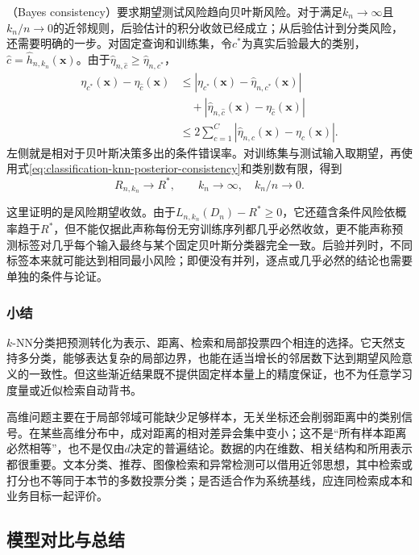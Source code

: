 （Bayes consistency）要求期望测试风险趋向贝叶斯风险。对于满足$k_n\to\infty$且$k_n/n\to0$的近邻规则，后验估计的积分收敛已经成立；从后验估计到分类风险，还需要明确的一步。对固定查询和训练集，令$c^\ast$为真实后验最大的类别，$\hat c=\hat h_{n,k_n}(\bm{x})$。由于$\hat\eta_{n,\hat c}\geq\hat\eta_{n,c^\ast}$，
\begin{align*}
  \eta_{c^\ast}(\bm{x})-\eta_{\hat c}(\bm{x})
  &\leq|\eta_{c^\ast}(\bm{x})-\hat\eta_{n,c^\ast}(\bm{x})|\\
  &\quad+|\hat\eta_{n,\hat c}(\bm{x})-\eta_{\hat c}(\bm{x})|\\
  &\leq2\sum_{c=1}^{C}
    |\hat\eta_{n,c}(\bm{x})-\eta_c(\bm{x})|.
\end{align*}
左侧就是相对于贝叶斯决策多出的条件错误率。对训练集与测试输入取期望，再使用式\eqref{eq:classification-knn-posterior-consistency}和类别数有限，得到
\begin{equation}
  R_{n,k_n}\longrightarrow R^\ast,
  \qquad k_n\to\infty,\quad k_n/n\to0.
  \label{eq:classification-knn-bayes-consistency}
\end{equation}

这里证明的是风险期望收敛。由于$L_{n,k_n}(D_n)-R^\ast\geq0$，它还蕴含条件风险依概率趋于$R^\ast$，但不能仅据此声称每份无穷训练序列都几乎必然收敛，更不能声称预测标签对几乎每个输入最终与某个固定贝叶斯分类器完全一致。后验并列时，不同标签本来就可能达到相同最小风险；即便没有并列，逐点或几乎必然的结论也需要单独的条件与论证。

\subsubsection{小结}
\label{sec:classification-knn-summary}

$k$-NN分类把预测转化为表示、距离、检索和局部投票四个相连的选择。它天然支持多分类，能够表达复杂的局部边界，也能在适当增长的邻居数下达到期望风险意义的一致性。但这些渐近结果既不提供固定样本量上的精度保证，也不为任意学习度量或近似检索自动背书。

高维问题主要在于局部邻域可能缺少足够样本，无关坐标还会削弱距离中的类别信号。在某些高维分布中，成对距离的相对差异会集中变小；这不是“所有样本距离必然相等”，也不是仅由$d$决定的普遍结论。数据的内在维数、相关结构和所用表示都很重要。文本分类、推荐、图像检索和异常检测可以借用近邻思想，其中检索或打分也不等同于本节的多数投票分类；是否适合作为系统基线，应连同检索成本和业务目标一起评价。

\subsection{模型对比与总结}
\label{sec:classification-instances-comparison}

